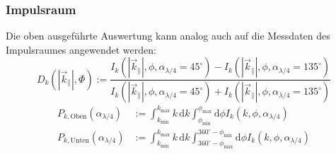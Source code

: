 \documentclass[a4paper, titlepage,  ngerman]{book}
\begin{document}
		\subsubsection{Impulsraum}
		Die oben ausgeführte Auswertung kann analog auch auf die Messdaten des Impulsraumes angewendet werden:
		\begin{equation}
			\label{eq:diff_measure_momentum}
			D_k\left(|\vec{k}_\parallel|, \Phi\right) := \dfrac{I_k(|\vec{k}_\parallel|, \phi, \alpha_{\lambda /4} = 45^\circ) - I_k(|\vec{k}_\parallel|, \phi, \alpha_{\lambda /4} = 135^\circ)}{I_k(|\vec{k}_\parallel|, \phi, \alpha_{\lambda /4} = 45^\circ) + I_k(|\vec{k}_\parallel|, \phi, \alpha_{\lambda /4} = 135^\circ)}
		\end{equation} 
		\begin{align}
			P_{k, \mathrm{Oben}}(\alpha_{\lambda/4}) &:= \int_{k_\mathrm{min}}^{k_\mathrm{max}}k \, \mathrm{d}k \int_{\phi_\mathrm{min}}^{\phi_\mathrm{max}} \mathrm{d}\phi I_k(k, \phi, \alpha_{\lambda /4}) \\
			\nonumber
			P_{k, \mathrm{Unten}}(\alpha_{\lambda/4}) &:= \int_{k_\mathrm{min}}^{k_\mathrm{max}}k \, \mathrm{d}k \int_{360^\circ -\phi_\mathrm{max}}^{360^\circ - \phi_\mathrm{min}} \mathrm{d}\phi I_k(k, \phi, \alpha_{\lambda/4})		 	
		\end{align}
		
\end{document}
